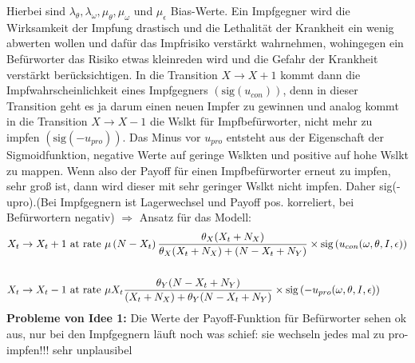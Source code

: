 \documentclass[10pt,a4paper]{article}
\begin{document}
Hierbei sind $\lambda_{\theta}, \lambda_{\omega}, \mu_{\theta}, \mu_{\omega}$ und $\mu_{\epsilon}$ Bias-Werte. Ein Impfgegner wird die Wirksamkeit der Impfung drastisch und die Lethalität der Krankheit ein wenig abwerten wollen und dafür das Impfrisiko verstärkt wahrnehmen, wohingegen ein Befürworter das Risiko etwas kleinreden wird und die Gefahr der Krankheit verstärkt berücksichtigen.\newline
In die Transition $X \rightarrow X + 1$ kommt dann die Impfwahrscheinlichkeit eines Impfgegners $(\mathrm{sig}\left( u_{con}\right))$, denn in dieser Transition geht es ja darum einen neuen Impfer zu gewinnen und analog kommt in die Transition $X \rightarrow X-1$ die Wslkt für Impfbefürworter, nicht mehr zu impfen $(\mathrm{sig}\left( -u_{pro}\right))$.\newline
Das Minus vor $u_{pro}$ entsteht aus der Eigenschaft der Sigmoidfunktion, negative Werte auf geringe Wslkten und positive auf hohe Wslkt zu mappen. Wenn also der Payoff für einen Impfbefürworter erneut zu impfen, sehr groß ist, dann wird dieser mit sehr geringer Wslkt nicht impfen. Daher sig(-upro).(Bei Impfgegnern ist Lagerwechsel und Payoff pos. korreliert, bei Befürwortern negativ)\newline
$\Rightarrow$ Ansatz für das Modell:
\begin{align*}
\begin{split}
X_t \rightarrow X_t + 1 & \textnormal{ at rate } \mu\left(N-X_t\right)\frac{\theta_X (X_t + N_X)}{\theta_X (X_t + N_X) + (N - X_t + N_Y)} \times \mathrm{sig}\left(u_{con}(\omega, \theta, I, \epsilon)\right) \\
&\\
X_t \rightarrow X_t - 1 & \textnormal{ at rate } \mu X_t\frac{\theta_Y(N-X_t+N_Y)}{(X_t + N_X) + \theta_Y(N-X_t+N_Y)} \times \mathrm{sig}\left(- u_{pro}(\omega, \theta, I, \epsilon)\right)
\end{split}
\end{align*}
\textbf{Probleme von Idee 1:}\newline
Die Werte der Payoff-Funktion für Befürworter sehen ok aus, nur bei den Impfgegnern läuft noch was schief: sie wechseln jedes mal zu pro-impfen!!! sehr unplausibel
\end{document}
